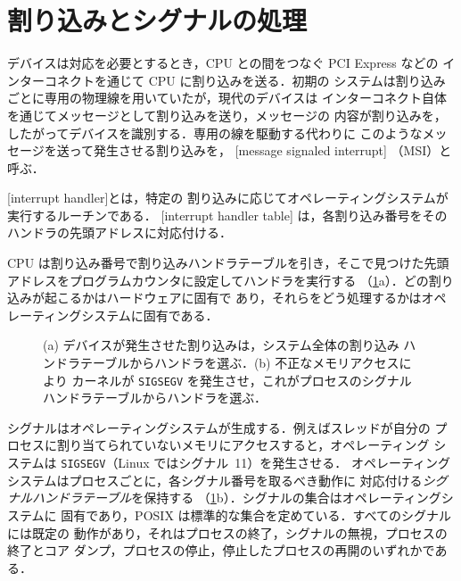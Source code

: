 \documentclass[../main.tex]{subfiles}
\begin{document}
\section{割り込みとシグナルの処理}
\label{sec:l05-handling}

デバイスは対応を必要とするとき，CPU との間をつなぐ PCI Express などの
インターコネクトを通じて CPU に割り込みを送る．初期の
システムは割り込みごとに専用の物理線を用いていたが，現代のデバイスは
インターコネクト自体を通じてメッセージとして割り込みを送り，メッセージの
内容が割り込みを，したがってデバイスを識別する．専用の線を駆動する代わりに
このようなメッセージを送って発生させる割り込みを，
[message signaled interrupt]%
（MSI）と呼ぶ．

\begin{definition}[割り込みハンドラ]
  [interrupt handler]とは，特定の
  割り込みに応じてオペレーティングシステムが実行するルーチンである．
  [interrupt handler table]%
  は，各割り込み番号をそのハンドラの先頭アドレスに対応付ける．
\end{definition}

CPU は割り込み番号で割り込みハンドラテーブルを引き，そこで見つけた先頭
アドレスをプログラムカウンタに設定してハンドラを実行する
（\cref{fig:l05-int-sig}a）．どの割り込みが起こるかはハードウェアに固有で
あり，それらをどう処理するかはオペレーティングシステムに固有である．

\begin{figure}[htbp]
  \centering
  
  \caption{(a) デバイスが発生させた割り込みは，システム全体の割り込み
    ハンドラテーブルからハンドラを選ぶ．(b) 不正なメモリアクセスにより
    カーネルが \texttt{SIGSEGV} を発生させ，これがプロセスのシグナル
    ハンドラテーブルからハンドラを選ぶ．}
  \label{fig:l05-int-sig}
\end{figure}

シグナルはオペレーティングシステムが生成する．例えばスレッドが自分の
プロセスに割り当てられていないメモリにアクセスすると，オペレーティング
システムは \texttt{SIGSEGV}（Linux ではシグナル~11）を発生させる．%
オペレーティングシステムはプロセスごとに，各シグナル番号を取るべき動作に
対応付ける\emph{シグナルハンドラテーブル}を保持する
（\cref{fig:l05-int-sig}b）．シグナルの集合はオペレーティングシステムに
固有であり，POSIX は標準的な集合を定めている．すべてのシグナルには既定の
動作があり，それはプロセスの終了，シグナルの無視，プロセスの終了とコア
ダンプ，プロセスの停止，停止したプロセスの再開のいずれかである．
\end{document}
